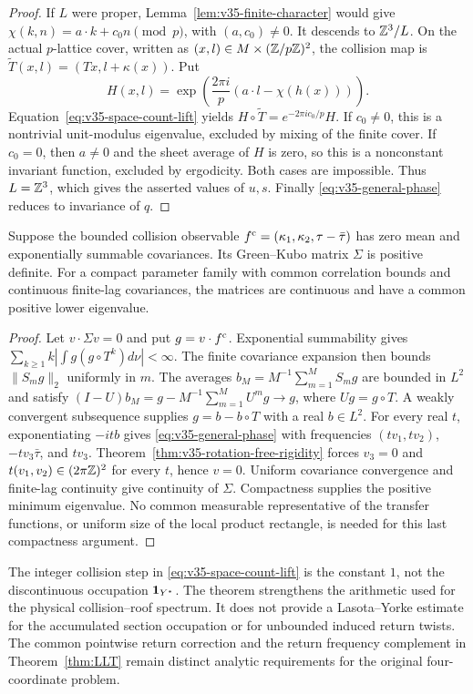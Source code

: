 \begin{proof}
If $L$ were proper, Lemma~\ref{lem:v35-finite-character} would give
$\chi(k,n)=a\cdot k+c_0 n\pmod p$, with $(a,c_0)\ne0$.
It descends to $\mathbb Z^3/L$. On the actual $p$-lattice cover, written as
$(x,l)\in M\times(\mathbb Z/p\mathbb Z)^2$, the collision map is
$\widetilde T(x,l)=(Tx,l+\kappa(x))$. Put
\[
 H(x,l)=\exp\left(\frac{2\pi i}{p}
                         (a\cdot l-\chi(h(x)))\right).
\]
Equation~\eqref{eq:v35-space-count-lift} yields
$H\circ\widetilde T=e^{-2\pi i c_0/p}H$.
If $c_0\ne0$, this is a nontrivial unit-modulus eigenvalue, excluded
by mixing of the finite cover. If $c_0=0$, then $a\ne0$ and the
sheet average of $H$ is zero, so this is a nonconstant invariant
function, excluded by ergodicity. Both cases are impossible. Thus
$L=\mathbb Z^3$, which gives the asserted values of $u,s$. Finally
\eqref{eq:v35-general-phase} reduces to invariance of $q$.
\end{proof}

\begin{corollary}
\label{cor:v35-general-covariance}
Suppose the bounded collision observable
$f^{\rm c}=(\kappa_1,\kappa_2,\tau-\bar\tau)$ has zero mean and
exponentially summable covariances. Its Green--Kubo matrix $\Sigma$ is
positive definite. For a compact parameter family with common
correlation bounds and continuous finite-lag covariances, the matrices
are continuous and have a common positive lower eigenvalue.
\end{corollary}
\begin{proof}
Let $v\cdot\Sigma v=0$ and put $g=v\cdot f^{\rm c}$. Exponential
summability gives $\sum_{k\ge1}k|\int g(g\circ T^k)d\nu|<\infty$.
The finite covariance expansion then bounds $\|S_mg\|_2$ uniformly
in $m$. The averages $b_M=M^{-1}\sum_{m=1}^M S_mg$ are bounded in
$L^2$ and satisfy
$(I-U)b_M=g-M^{-1}\sum_{m=1}^M U^m g\to g$, where $Ug=g\circ T$.
A weakly convergent subsequence supplies $g=b-b\circ T$ with a real
$b\in L^2$. For every real $t$, exponentiating $-itb$ gives
\eqref{eq:v35-general-phase} with frequencies
$(tv_1,tv_2)$, $-tv_3\bar\tau$, and $tv_3$.
Theorem~\ref{thm:v35-rotation-free-rigidity} forces $v_3=0$ and
$t(v_1,v_2)\in(2\pi\mathbb Z)^2$ for every $t$, hence $v=0$.
Uniform covariance convergence and finite-lag continuity give continuity
of $\Sigma$. Compactness supplies the positive minimum eigenvalue.
No common measurable representative of the transfer functions, or
uniform size of the local product rectangle, is needed for this last
compactness argument.
\end{proof}

\begin{remark}
\label{rem:v35-return-distinction}
The integer collision step in \eqref{eq:v35-space-count-lift} is the
constant $1$, not the discontinuous occupation $\mathbf1_{Y^*}$.
The theorem strengthens the arithmetic used for the physical
collision--roof spectrum. It does not provide a Lasota--Yorke estimate
for the accumulated section occupation or for unbounded induced
return twists. The common pointwise return correction and the return
frequency complement in Theorem~\ref{thm:LLT} remain distinct analytic
requirements for the original four-coordinate problem.
\end{remark}

